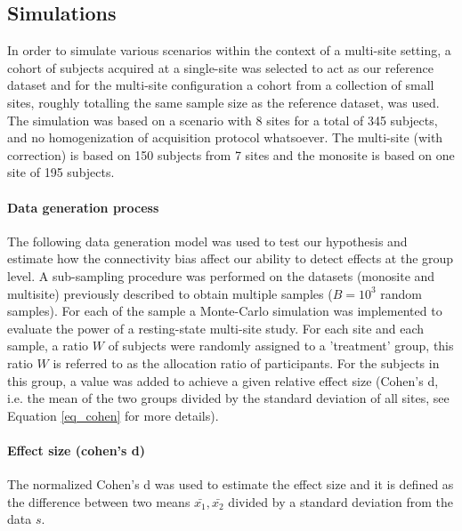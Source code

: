 \documentclass[authoryear]{elsarticle}
\begin{document}
\subsection{Simulations}

In order to simulate various scenarios within the context of a multi-site setting, a cohort of subjects acquired at a single-site was selected to act as our reference dataset and for the multi-site configuration a cohort from a collection of small sites, roughly totalling the same sample size as the reference dataset, was used. The simulation was based on a scenario with 8 sites for a total of 345 subjects, and no homogenization of acquisition protocol whatsoever. The multi-site (with correction) is based on 150 subjects from 7 sites and the monosite is based on one site of 195 subjects.  

\paragraph{Data generation process}
The following data generation model was used to test our hypothesis and estimate how the connectivity bias affect our ability to detect effects at the group level.
A sub-sampling procedure was performed on the datasets (monosite and multisite) previously described to obtain multiple samples ($B=10^3$ random samples). For each of the sample a Monte-Carlo simulation was implemented to evaluate the power of a resting-state multi-site study. For each site and each sample, a ratio $W$ of subjects were randomly assigned to a 'treatment' group, this ratio $W$ is referred to as the allocation ratio of participants. For the subjects in this group, a value was added to achieve a given relative effect size (Cohen's d, i.e. the mean of the two groups divided by the standard deviation of all sites, see Equation \ref{eq_cohen} for more details).


\paragraph{Effect size (cohen's d)}
The normalized Cohen's d was used to estimate the effect size and it is defined as the difference between two means $\bar{x_{1}},\bar{x_{2}}$ divided by a standard deviation from the data $s$.
\end{document}
